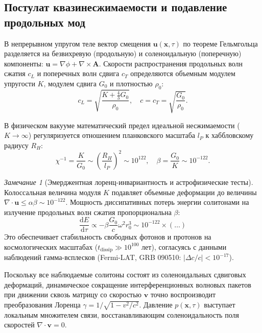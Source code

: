 \documentclass[11pt,a4paper]{article}
\theoremstyle{definition}
\theoremstyle{remark}
\newtheorem{remark}{Замечание}[section]
\begin{document}
\subsection{Постулат квазинесжимаемости и подавление продольных мод}
В непрерывном упругом теле вектор смещения $\mathbf{u}(\mathbf{x}, \tau)$ по теореме Гельмгольца разделяется на безвихревую (продольную) и соленоидальную (поперечную) компоненты: $\mathbf{u} = \nabla \phi + \nabla \times \mathbf{A}$. Скорости распространения продольных волн сжатия $c_L$ и поперечных волн сдвига $c_T$ определяются объемным модулем упругости $K$, модулем сдвига $G_0$ и плотностью $\rho_0$:
\begin{equation}
    c_L = \sqrt{\frac{K + \frac{4}{3}G_0}{\rho_0}}, \quad c = c_T = \sqrt{\frac{G_0}{\rho_0}}.
\end{equation}

В физическом вакууме математический предел идеальной несжимаемости ($K \to \infty$) регуляризуется отношением планковского масштаба $l_P$ к хаббловскому радиусу $R_H$:
\begin{equation}
    \chi^{-1} = \frac{K}{G_0} \sim \left( \frac{R_H}{l_P} \right)^2 \sim 10^{122}, \quad \beta = \frac{G_0}{K} \sim 10^{-122}.
    \label{eq:bulk_ratio}
\end{equation}

\begin{remark}[Эмерджентная лоренц-инвариантность и астрофизические тесты]
Колоссальная величина модуля $K$ подавляет объемные деформации до величины $\nabla \cdot \mathbf{u} \le \alpha \beta \sim 10^{-122}$. Мощность диссипативных потерь энергии солитонами на излучение продольных волн сжатия пропорциональна $\beta$:
\begin{equation}
    \frac{\mathrm{d}E}{\mathrm{d}\tau} \propto -\beta \frac{G_0}{c} \omega^2 r_0^3 \sim 10^{-122} \times (\dots)
\end{equation}
Это обеспечивает стабильность свободных фотонов и протонов на космологических масштабах ($t_{\mathrm{dissip}} \gg 10^{100}$ лет), согласуясь с данными наблюдений гамма-всплесков (Fermi-LAT, GRB 090510: $|\Delta c/c| < 10^{-17}$). 

Поскольку все наблюдаемые солитоны состоят из соленоидальных сдвиговых деформаций, динамическое сокращение интерференционных волновых пакетов при движении сквозь матрицу со скоростью $\mathbf{v}$ точно воспроизводит преобразования Лоренца $\gamma = 1/\sqrt{1 - v^2/c^2}$. Давление $p(\mathbf{x}, \tau)$ выступает локальным множителем связи, восстанавливающим соленоидальность поля скоростей $\nabla \cdot \mathbf{v} = 0$.
\end{remark}
\end{document}
